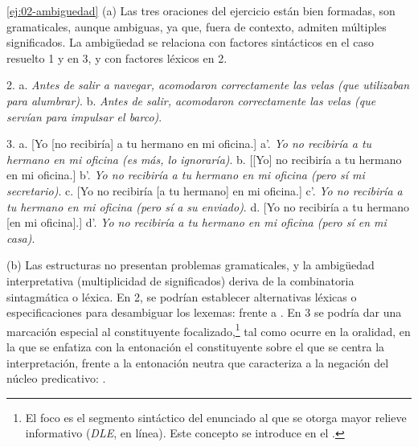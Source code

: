 \begin{solucion}{\ref{ej:02-ambiguedad}}
(a) Las tres oraciones del ejercicio están bien formadas, son gramaticales,
aunque ambiguas, ya que, fuera de contexto, admiten múltiples significados. La
ambigüedad se relaciona con factores sintácticos en el caso resuelto 1 y en 3,
y con factores léxicos en 2.

2. a. \textit{Antes de salir a navegar, acomodaron correctamente las velas (que
utilizaban para alumbrar)}. b. \textit{Antes de salir, acomodaron correctamente
las velas (que servían para impulsar el barco)}.

3. a. [Yo [no recibiría] a tu hermano en mi oficina.] a'. \textit{Yo no
recibiría a tu hermano en mi oficina (es más, lo ignoraría)}. b. [[Yo] no
recibiría a tu hermano en mi oficina.] b'. \textit{Yo no recibiría a tu hermano
en mi oficina (pero sí mi secretario)}. c. [Yo no recibiría [a tu hermano] en mi
oficina.] c'. \textit{Yo no recibiría a tu hermano en mi oficina (pero sí a su
enviado)}. d. [Yo no recibiría a tu hermano [en mi oficina].] d'. \textit{Yo no
recibiría a tu hermano en mi oficina (pero sí en mi casa)}.

(b) Las estructuras no presentan problemas gramaticales, y la ambigüedad
interpretativa (multiplicidad de significados) deriva de la combinatoria
sintagmática o léxica. En 2, se podrían establecer alternativas léxicas o
especificaciones para desambiguar los lexemas:  frente a . En 3 se podría dar
una marcación especial al constituyente focalizado,\footnote{El foco es el
segmento sintáctico del enunciado al que se otorga mayor relieve informativo
(\textit{DLE}, en línea). Este concepto se introduce en el .} tal
como ocurre en la oralidad, en la que se enfatiza con la entonación el
constituyente sobre el que se centra la interpretación, frente a la entonación
neutra que caracteriza a la negación del núcleo predicativo: .
\end{solucion}

